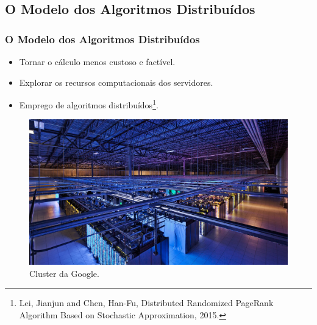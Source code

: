 \documentclass{beamer}
\begin{document}
\begin{frame}
	\subsection{O Modelo dos Algoritmos Distribuídos}
	\frametitle{O Modelo dos Algoritmos Distribuídos}
	
\begin{itemize}
\item Tornar o c\'alculo menos custoso e factível.
\vspace{0.2cm}
\item Explorar os recursos computacionais dos servidores.
\vspace{0.2cm}
\item Emprego de algoritmos distribu\'idos\footnote{\tiny \justifying Lei, Jianjun and Chen, Han-Fu, Distributed Randomized PageRank Algorithm Based on Stochastic Approximation, 2015.}.
\end{itemize}
\vspace{0.4cm}
\begin{figure}[!htb]
	\centering
	\includegraphics[scale=0.07]{figures/cluster}\\
	{\scriptsize Cluster da Google.}
\end{figure}	

\end{frame}
\end{document}
